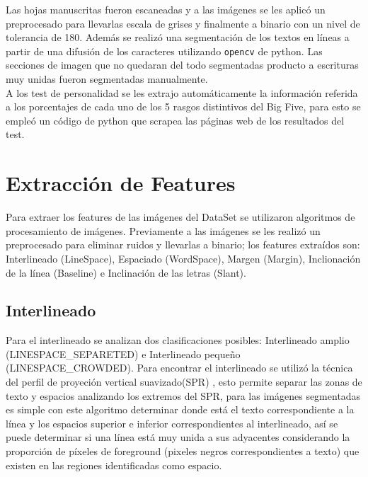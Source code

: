 \documentclass[10pt, a4paper]{article}
\begin{document}
        Las hojas manuscritas fueron escaneadas y a las im\'agenes se les aplic\'o un preprocesado para llevarlas escala de grises y finalmente a binario con un nivel de tolerancia de 180. Adem\'as se 
        realiz\'o una segmentaci\'on de los textos en l\'ineas a partir de una difusi\'on de los caracteres utilizando \texttt{opencv} de python. Las secciones de imagen que no quedaran 
        del todo segmentadas producto a escrituras muy unidas fueron segmentadas manualmente.\\ 

        A los test de personalidad se les extrajo autom\'aticamente la informaci\'on referida a los porcentajes de cada uno 
        de los 5 rasgos distintivos del Big Five, para esto se emple\'o un c\'odigo de python que scrapea las p\'aginas web de los resultados del test.\\ 

    \section{Extracci\'on de Features}
        Para extraer los features de las im\'agenes del DataSet se utilizaron algoritmos de procesamiento de im\'agenes. Previamente a las im\'agenes se les realiz\'o un 
        preprocesado para eliminar ruidos y llevarlas a binario; los features extra\'idos son: Interlineado (LineSpace), Espaciado (WordSpace), Margen (Margin), Inclionaci\'on de la l\'inea (Baseline) e Inclinaci\'on de las letras (Slant). 

        \subsection{Interlineado} 

            Para el interlineado se analizan dos clasificaciones posibles: Interlineado amplio (LINESPACE\_SEPARETED) e Interlineado peque\~no (LINESPACE\_CROWDED). Para encontrar el interlineado se utiliz\'o la t\'ecnica del perfil 
            de proyeci\'on vertical suavizado(SPR) \cite{20}, esto permite separar las zonas de texto y espacios analizando los extremos del SPR, para las im\'agenes segmentadas es simple con este algoritmo determinar donde est\'a el texto correspondiente a la l\'inea y los espacios superior e inferior
            correspondientes al interlineado, as\'i se puede determinar si una l\'inea est\'a muy unida a sus adyacentes considerando la proporci\'on de p\'ixeles de foreground (pixeles negros correspondientes a texto) que existen en 
            las regiones identificadas como espacio.
\end{document}
